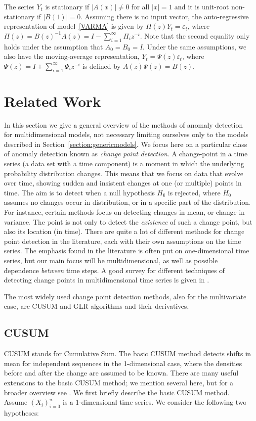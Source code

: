 \documentclass[conference,letterpaper]{IEEEtran}
\renewcommand\epsilon{\varepsilon}
\begin{document}
The series $Y_t$ is stationary if $|A(x)| \neq 0$ for all $|x| =1$ and it is unit-root non-stationary if $|B(1)| = 0$. Assuming there is no input vector, the 
auto-regressive representation of model~\eqref{VARMA} is given by $\Pi(z)Y_t = \epsilon_t$, where $\Pi(z) = B(z)^{-1}A(z) = I - \sum_{i=1}^{\infty} \Pi_i z^{-
i}$. Note that the second equality only holds under the assumption that $A_0 = B_0 = I$. Under the same assumptions, we also have the moving-average 
representation, $Y_t = \Psi(z)\epsilon_t$, where $\Psi(z) = I + \sum_{i=1}^{\infty} \Psi_i z^{-i}$ is defined by $A(z)\Psi(z) = B(z)$.

\section{Related Work}

In this section we give a general overview of the methods of anomaly detection for multidimensional models, not necessary limiting ourselves only to the 
models described in Section~\ref{section:genericmodels}. We focus here on a particular class of anomaly detection known as \textit{change point detection}. A 
change-point in a time series (a data set with a time component) is a moment in which the underlying probability
distribution changes. This means that we focus on data that evolve over time, showing sudden  and insistent changes at one (or multiple) points in time.   
The aim is to detect when a null hypothesis $H_0$ is rejected, where $H_0$ assumes no changes occur in distribution, or in a specific part of the 
distribution.  For instance, certain methods focus on detecting changes in mean, or change in variance. The point is not only to detect the \textit{existence}
 of such a change point, but also its location (in time). There are quite a lot of different methods for change point detection in the literature, each with 
their own assumptions on the time series.
The emphasis found in the literature is often put on one-dimensional time series, but our main focus will be multidimensional, as well as possible dependence 
\textit{between} time steps. A good survey for different techniques of detecting change points in multidimensional time series   is given in \cite{BANI}.

 The most widely used change point detection methods, also for the multivariate case, are CUSUM and GLR algorithms and their derivatives.

\subsection{CUSUM} \label{CUSUM}
CUSUM stands for Cumulative Sum. The basic CUSUM method detects shifts in mean for independent sequences in the 1-dimensional case, where the densities before and after the change are assumed to be known. 
There are many useful extensions to the basic CUSUM method; we mention several here, but for a broader overview see \cite{BANI}. We first briefly describe the basic CUSUM method. Assume $(X_i)_{i=0}^n$ is a 1-dimensional time series. We consider the following two hypotheses:
\end{document}
